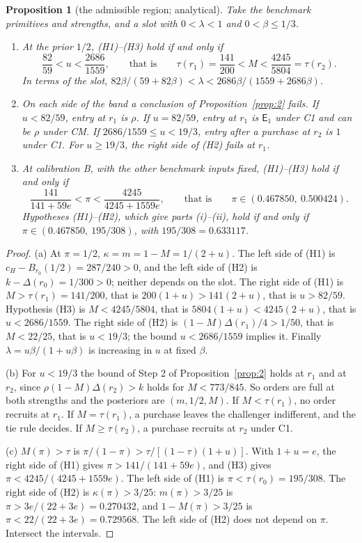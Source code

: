 \documentclass[11pt]{article}
\newtheorem{proposition}{Proposition}
\theoremstyle{definition}
\newcommand{\Ent}{\mathsf E}
\begin{document}
\setcounter{proposition}{3}
\begin{proposition}[the admissible region; analytical]\label{prop:region}
Take the benchmark primitives and strengths, and a slot with $0<\lambda<1$ and $0<\beta\le1/3$.
\begin{enumerate}[label=(\alph*)]
\item At the prior $1/2$, (H1)--(H3) hold if and only if
  \[
  \frac{82}{59}<u<\frac{2686}{1559},\qquad\text{that is}\qquad \tau(r_1)=\frac{141}{200}<M<\frac{4245}{5804}=\tau(r_2).
  \]
  In terms of the slot, $82\beta/(59+82\beta)<\lambda<2686\beta/(1559+2686\beta)$.
\item On each side of the band a conclusion of Proposition~\ref{prop:2} fails. If $u<82/59$, entry at $r_1$ is
  $\rho$. If $u=82/59$, entry at $r_1$ is $\Ent_1$ under C1 and can be $\rho$ under CM. If $2686/1559\le u<19/3$,
  entry after a purchase at $r_2$ is $1$ under C1. For $u\ge19/3$, the right side of (H2) fails at $r_1$.
\item At calibration B, with the other benchmark inputs fixed, (H1)--(H3) hold if and only if
  \[
  \frac{141}{141+59e}<\pi<\frac{4245}{4245+1559e},\qquad\text{that is}\qquad \pi\in(0.467850,\ 0.500424).
  \]
  Hypotheses (H1)--(H2), which give parts (i)--(ii), hold if and only if $\pi\in(0.467850,\ 195/308)$, with
  $195/308=0.633117$.
\end{enumerate}
\end{proposition}

\begin{proof}
(a) At $\pi=1/2$, $\kappa=m=1-M=1/(2+u)$. The left side of (H1) is $c_H-B_{r_0}(1/2)=287/240>0$, and the left
side of (H2) is $k-\Delta(r_0)=1/300>0$; neither depends on the slot. The right side of (H1) is
$M>\tau(r_1)=141/200$, that is $200(1+u)>141(2+u)$, that is $u>82/59$. Hypothesis (H3) is $M<4245/5804$, that is
$5804(1+u)<4245(2+u)$, that is $u<2686/1559$. The right side of (H2) is $(1-M)\Delta(r_1)/4>1/50$, that is
$M<22/25$, that is $u<19/3$; the bound $u<2686/1559$ implies it. Finally $\lambda=u\beta/(1+u\beta)$ is increasing
in $u$ at fixed $\beta$.

(b) For $u<19/3$ the bound of Step 2 of Proposition~\ref{prop:2} holds at $r_1$ and at $r_2$, since
$\rho(1-M)\Delta(r_2)>k$ holds for $M<773/845$. So orders are full at both strengths and the posteriors are
$(m,1/2,M)$. If $M<\tau(r_1)$, no order recruits at $r_1$. If $M=\tau(r_1)$, a purchase leaves the challenger
indifferent, and the tie rule decides. If $M\ge\tau(r_2)$, a purchase recruits at $r_2$ under C1.

(c) $M(\pi)>\tau$ is $\pi/(1-\pi)>\tau/[(1-\tau)(1+u)]$. With $1+u=e$, the right side of (H1) gives
$\pi>141/(141+59e)$, and (H3) gives $\pi<4245/(4245+1559e)$. The left side of (H1) is $\pi<\tau(r_0)=195/308$. The
right side of (H2) is $\kappa(\pi)>3/25$: $m(\pi)>3/25$ is $\pi>3e/(22+3e)=0.270432$, and $1-M(\pi)>3/25$ is
$\pi<22/(22+3e)=0.729568$. The left side of (H2) does not depend on $\pi$. Intersect the intervals.
\end{proof}
\end{document}
